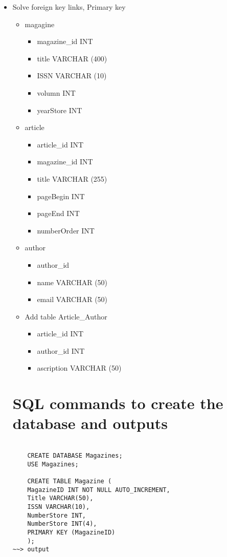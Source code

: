 \documentclass[13pt,a4paper]{report}
\begin{document}
\begin{itemize}
\item Solve foreign key links, Primary key
	\begin{itemize}
	\item magagine
		\begin{itemize}
		\item magazine_id INT
		\item title VARCHAR (400)
		\item ISSN VARCHAR (10)
		\item volumn INT
		\item yearStore INT
		\end{itemize}
	\item article
		\begin{itemize}
		\item article_id INT
		\item magazine_id INT
		\item title VARCHAR (255)
		\item pageBegin INT 
		\item pageEnd INT 
		\item numberOrder INT
		\end{itemize}
	\item author
		\begin{itemize}
		\item author_id
		\item name VARCHAR (50)
		\item email VARCHAR (50)
		\end{itemize}
	\item Add table Article_Author
		\begin{itemize}
		\item article_id INT
		\item author_id INT
		\item ascription VARCHAR (50)
		\end{itemize}
	\end{itemize}

\section{ SQL commands to create the database and outputs}
\begin{lstlisting}
		
	CREATE DATABASE Magazines;
	USE Magazines;	

	CREATE TABLE Magazine ( 
	MagazineID INT NOT NULL AUTO_INCREMENT, 
	Title VARCHAR(50), 
	ISSN VARCHAR(10), 
	NumberStore INT, 
	NumberStore INT(4), 
	PRIMARY KEY (MagazineID)
	);
~~> output



\end{lstlisting}
\end{itemize}
\end{document}
